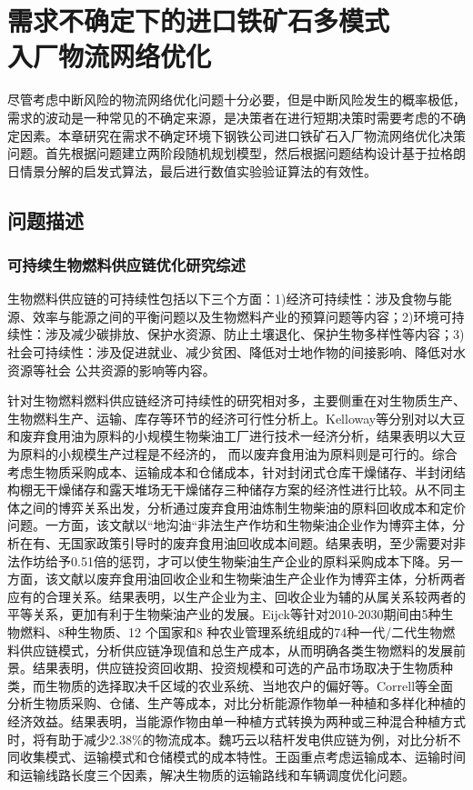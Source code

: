\chapter[需求不确定下的进口铁矿石多模式入厂物流网络优化]{需求不确定下的进口铁矿石多模式\\入厂物流网络优化}

尽管考虑中断风险的物流网络优化问题十分必要，但是中断风险发生的概率极低，需求的波动是一种常见的不确定来源，是决策者在进行短期决策时需要考虑的不确定因素。本章研究在需求不确定环境下钢铁公司进口铁矿石入厂物流网络优化决策问题。首先根据问题建立两阶段随机规划模型，然后根据问题结构设计基于拉格朗日情景分解的启发式算法，最后进行数值实验验证算法的有效性。

\section{问题描述}
\subsection{可持续生物燃料供应链优化研究综述}
生物燃料供应链的可持续性包括以下三个方面\cite{Awudu2012}：1)经济可持续性：涉及食物与能源、效率与能源之间的平衡问题以及生物燃料产业的预算问题等内容；2)环境可持续性：涉及减少碳排放、保护水资源、防止土壤退化、保护生物多样性等内容；3)社会可持续性：涉及促进就业、减少贫困、降低对士地作物的间接影响、降低对水资源等社会 公共资源的影响等内容。

针对生物燃料燃料供应链经济可持续性的研究相对多，主要侧重在对生物质生产、生物燃料生产、运输、库存等环节的经济可行性分析上。Kelloway等\cite{Kelloway2013}分别对以大豆和废弃食用油为原料的小规模生物柴油工厂进行技术一经济分析，结果表明以大豆为原料的小规模生产过程是不经济的， 而以废弃食用油为原料则是可行的。\citet{魏巧云2013}综合考虑生物质采购成本、运输成本和仓储成本，针对封闭式仓库干燥储存、半封闭结构棚无干燥储存和露天堆场无干燥储存三种储存方案的经济性进行比较。\citet{李璐2013}从不同主体之间的博弈关系出发，分析通过废弃食用油炼制生物柴油的原料回收成本和定价问题。一方面，该文献以“地沟油“非法生产作坊和生物柴油企业作为博弈主体，分析在有、无国家政策引导时的废弃食用油回收成本间题。结果表明，至少需要对非法作坊给予0.51倍的惩罚，才可以使生物柴油生产企业的原料采购成本下降。另一方面，该文献以废弃食用油回收企业和生物柴油生产企业作为博弈主体，分析两者应有的合理关系。结果表明，以生产企业为主、回收企业为辅的从属关系较两者的平等关系，更加有利于生物柴油产业的发展。Eijck等\cite{Eijck2014}针对2010-2030期间由5种生物燃料、8种生物质、12 个国家和8 种农业管理系统组成的74种一代/二代生物燃料供应链模式，分析供应链净现值和总生产成本，从而明确各类生物燃料的发展前景。结果表明，供应链投资回收期、投资规模和可选的产品市场取决于生物质种类，而生物质的选择取决千区域的农业系统、当地农户的偏好等。Correll等\cite{Correll2014}全面分析生物质采购、仓储、生产等成本，对比分析能源作物单一种植和多样化种植的经济效益。结果表明，当能源作物由单一种植方式转换为两种或三种混合种植方式时，将有助于减少2.38\%的物流成本。魏巧云\cite{魏巧云2014}以秸杆发电供应链为例，对比分析不同收集模式、运输模式和仓储模式的成本特性。王函\cite{王函2014}重点考虑运输成本、运输时间和运输线路长度三个因素，解决生物质的运输路线和车辆调度优化问题。

